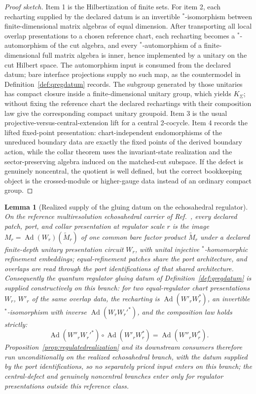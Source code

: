 \documentclass[11pt]{article}
\newtheorem{lemma}[theorem]{Lemma}
\begin{document}
\begin{proof}[Proof sketch]
Item 1 is the Hilbertization of finite sets. For item 2, each recharting supplied by the declared datum is an invertible \(^*\)-isomorphism between finite-dimensional matrix algebras of equal dimension. After transporting all local overlap presentations to a chosen reference chart, each recharting becomes a \(^*\)-automorphism of the cut algebra, and every \(^*\)-automorphism of a finite-dimensional full matrix algebra is inner, hence implemented by a unitary on the cut Hilbert space. The automorphism input is consumed from the declared datum; bare interface projections supply no such map, as the countermodel in Definition~\ref{def:qregdatum} records. The subgroup generated by those unitaries has compact closure inside a finite-dimensional unitary group, which yields \(K_\Sigma\); without fixing the reference chart the declared rechartings with their composition law give the corresponding compact unitary groupoid. Item 3 is the usual projective-versus-central-extension lift for a central 2-cocycle. Item 4 records the lifted fixed-point presentation: chart-independent endomorphisms of the unreduced boundary data are exactly the fixed points of the derived boundary action, while the collar theorem uses the invariant-state realization and the sector-preserving algebra induced on the matched-cut subspace. If the defect is genuinely noncentral, the quotient is well defined, but the correct bookkeeping object is the crossed-module or higher-gauge data instead of an ordinary compact group.
\end{proof}

\begin{lemma}[Realized supply of the gluing datum on the echosahedral regulator]\label{lem:qregdatum-realized}
On the reference multiresolution echosahedral carrier of Ref.~\cite{ophmicrophysics}, every declared patch, port, and collar presentation at regulator scale \(r\) is the image \(M_r=\operatorname{Ad}(W_r)(\widetilde M_r)\) of one common bare factor product \(\widetilde M_r\) under a declared finite-depth unitary presentation circuit \(W_r\), with unital injective \(^*\)-homomorphic refinement embeddings; equal-refinement patches share the port architecture, and overlaps are read through the port identifications of that shared architecture. Consequently the quantum regulator gluing datum of Definition~\ref{def:qregdatum} is supplied constructively on this branch: for two equal-regulator chart presentations \(W_r\), \(W'_r\) of the same overlap data, the recharting is \(\operatorname{Ad}(W'_rW_r^{*})\), an invertible \(^*\)-isomorphism with inverse \(\operatorname{Ad}(W_rW_r'^{*})\), and the composition law holds strictly:
\[
\operatorname{Ad}(W''_rW_r'^{*})\circ\operatorname{Ad}(W'_rW_r^{*})=\operatorname{Ad}(W''_rW_r^{*}).
\]
Proposition~\ref{prop:regulatedrealization} and its downstream consumers therefore run unconditionally on the realized echosahedral branch, with the datum supplied by the port identifications, so no separately priced input enters on this branch; the central-defect and genuinely noncentral branches enter only for regulator presentations outside this reference class.
\end{lemma}
\end{document}
